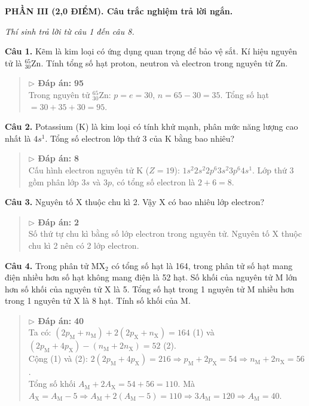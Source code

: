 \documentclass[11pt,a4paper]{article}
\begin{document}
\vspace{6pt}
{\color{myGreen}\bfseries\large PHẦN III (2,0 ĐIỂM). Câu trắc nghiệm trả lời ngắn.}

\textit{\small Thí sinh trả lời từ câu 1 đến câu 8.}
\vspace{3pt}

\textbf{Câu 1.} Kẽm là kim loại có ứng dụng quan trọng để bảo vệ sắt. Kí hiệu nguyên tử là $^{65}_{30}\text{Zn}$. Tính tổng số hạt proton, neutron và electron trong nguyên tử Zn.\\
\begin{quote}\small
{\color{myBlue}\textbf{$\triangleright$ Đáp án:}} \textbf{\color{red} 95}\\
Trong nguyên tử $^{65}_{30}\text{Zn}$: $p = e = 30$, $n = 65 - 30 = 35$. Tổng số hạt $= 30 + 35 + 30 = 95$.
\end{quote}


\textbf{Câu 2.} Potassium (K) là kim loại có tính khử mạnh, phân mức năng lượng cao nhất là $4s^1$. Tổng số electron lớp thứ 3 của K bằng bao nhiêu?\\
\begin{quote}\small
{\color{myBlue}\textbf{$\triangleright$ Đáp án:}} \textbf{\color{red} 8}\\
Cấu hình electron nguyên tử K ($Z = 19$): $1s^2 2s^2 2p^6 3s^2 3p^6 4s^1$. Lớp thứ 3 gồm phân lớp $3s$ và $3p$, có tổng số electron là $2 + 6 = 8$.
\end{quote}


\textbf{Câu 3.} Nguyên tố X thuộc chu kì 2. Vậy X có bao nhiêu lớp electron?\\
\begin{quote}\small
{\color{myBlue}\textbf{$\triangleright$ Đáp án:}} \textbf{\color{red} 2}\\
Số thứ tự chu kì bằng số lớp electron trong nguyên tử. Nguyên tố X thuộc chu kì 2 nên có 2 lớp electron.
\end{quote}


\textbf{Câu 4.} Trong phân tử $\text{MX}_2$ có tổng số hạt là 164, trong phân tử số hạt mang điện nhiều hơn số hạt không mang điện là 52 hạt. Số khối của nguyên tử M lớn hơn số khối của nguyên tử X là 5. Tổng số hạt trong 1 nguyên tử M nhiều hơn trong 1 nguyên tử X là 8 hạt. Tính số khối của M.\\
\begin{quote}\small
{\color{myBlue}\textbf{$\triangleright$ Đáp án:}} \textbf{\color{red} 40}\\
Ta có: $(2p_\text{M} + n_\text{M}) + 2(2p_\text{X} + n_\text{X}) = 164$ (1) và $(2p_\text{M} + 4p_\text{X}) - (n_\text{M} + 2n_\text{X}) = 52$ (2).\\
Cộng (1) và (2): $2(2p_\text{M} + 4p_\text{X}) = 216 \Rightarrow p_\text{M} + 2p_\text{X} = 54 \Rightarrow n_\text{M} + 2n_\text{X} = 56$.\\
Tổng số khối $A_\text{M} + 2A_\text{X} = 54 + 56 = 110$. Mà $A_\text{X} = A_\text{M} - 5 \Rightarrow A_\text{M} + 2(A_\text{M} - 5) = 110 \Rightarrow 3A_\text{M} = 120 \Rightarrow A_\text{M} = 40$.
\end{quote}
\end{document}
